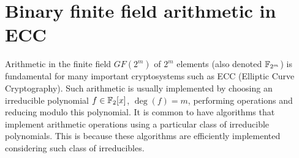 





\section{Binary finite field arithmetic in ECC} \label{background:binary}


Arithmetic in the finite field $GF(2^m)$ of $2^m$ elements (also denoted $\mathbb{F}_{2^m}$) is fundamental for many important cryptosystems such as ECC (Elliptic Curve Cryptography). Such arithmetic is usually implemented by choosing an irreducible polynomial $f \in \mathbb{F}_2[x]$, $\deg(f) = m$, performing operations and reducing modulo this polynomial. It is common to have algorithms that implement arithmetic operations using a particular class of irreducible polynomials. This is because these algorithms are efficiently implemented considering such class of irreducibles.\\

